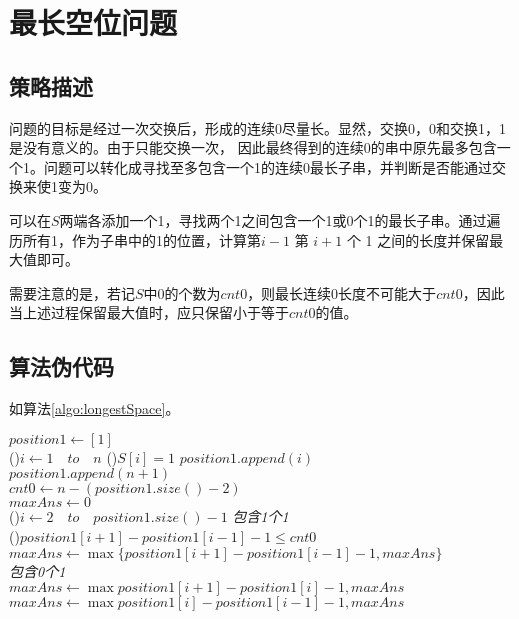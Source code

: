 \section{最长空位问题}
\subsection{策略描述}
问题的目标是经过一次交换后，形成的连续0尽量长。显然，交换0，0和交换1，1是没有意义的。由于只能交换一次，
因此最终得到的连续0的串中原先最多包含一个1。问题可以转化成寻找至多包含一个1的连续0最长子串，并判断是否能通过交换来使1变为0。

可以在$S$两端各添加一个1，寻找两个1之间包含一个1或0个1的最长子串。通过遍历所有1，作为子串中的1的位置，计算第$i-1$ 第 $i+1$ 个 1 之间的长度并保留最大值即可。

需要注意的是，若记$S$中0的个数为$cnt0$，则最长连续0长度不可能大于$cnt0$，因此当上述过程保留最大值时，应只保留小于等于$cnt0$的值。
 

\subsection{算法伪代码}
如算法\ref{algo:longestSpace}。

\begin{algorithm}[H]
    \caption{$longestSpace(S[1..n])$}\label{algo:longestSpace}
    $position1 \leftarrow [1]$\\
    \For(){$i\leftarrow 1 \quad to \quad n$}{
        \If(){$S[i] = 1$}{
            $position1.append(i)$\\
        }
    }
    $position1.append(n+1)$\\
    $cnt0 \leftarrow n - (position1.size()-2)$ \\
    $maxAns \leftarrow 0$\\
    \For(){$i \leftarrow 2 \quad to \quad position1.size()-1$}{
        \emph{包含1个1}\\
        \If(){$position1[i+1] - position1[i-1] - 1  \le cnt0$}{
           $maxAns \leftarrow \max\{position1[i+1] - position1[i-1] - 1 , maxAns\}$\\ 
        }
        \emph{包含0个1}\\
        $maxAns \leftarrow \max{position1[i+1] - position1[i] - 1  ,maxAns}$\\
        $maxAns \leftarrow \max{position1[i] - position1[i-1] - 1  ,maxAns}$\\
    }
\end{algorithm}


